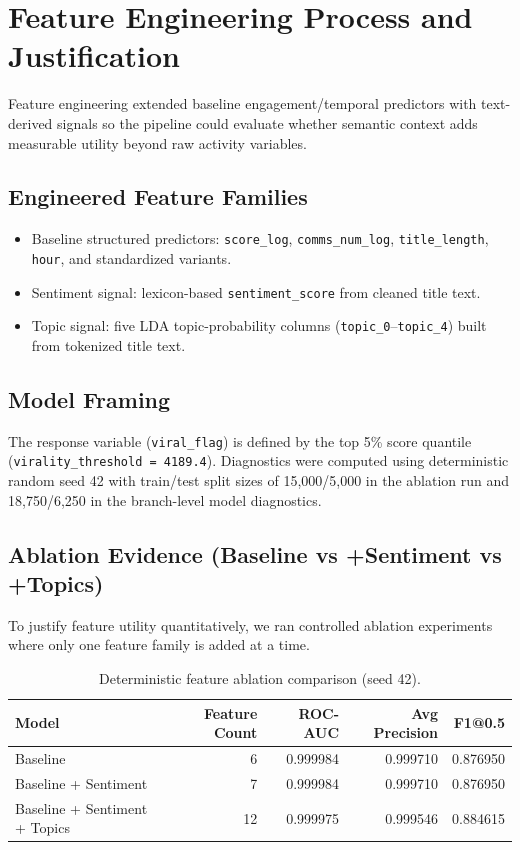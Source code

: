 \section{Feature Engineering Process and Justification}

Feature engineering extended baseline engagement/temporal predictors with text-derived signals so the pipeline could evaluate whether semantic context adds measurable utility beyond raw activity variables.

\subsection{Engineered Feature Families}
\begin{itemize}
  \item Baseline structured predictors: \texttt{score\_log}, \texttt{comms\_num\_log}, \texttt{title\_length}, \texttt{hour}, and standardized variants.
  \item Sentiment signal: lexicon-based \texttt{sentiment\_score} from cleaned title text.
  \item Topic signal: five LDA topic-probability columns (\texttt{topic\_0}--\texttt{topic\_4}) built from tokenized title text.
\end{itemize}

\subsection{Model Framing}
The response variable (\texttt{viral\_flag}) is defined by the top 5\% score quantile (\texttt{virality\_threshold = 4189.4}). Diagnostics were computed using deterministic random seed 42 with train/test split sizes of 15,000/5,000 in the ablation run and 18,750/6,250 in the branch-level model diagnostics.

\subsection{Ablation Evidence (Baseline vs +Sentiment vs +Topics)}
To justify feature utility quantitatively, we ran controlled ablation experiments where only one feature family is added at a time.

\begin{table}[h]
\centering
\begin{tabular}{lrrrr}
\toprule
Model & Feature Count & ROC-AUC & Avg Precision & F1@0.5 \\
\midrule
Baseline & 6 & 0.999984 & 0.999710 & 0.876950 \\
Baseline + Sentiment & 7 & 0.999984 & 0.999710 & 0.876950 \\
Baseline + Sentiment + Topics & 12 & 0.999975 & 0.999546 & 0.884615 \\
\bottomrule
\end{tabular}
\caption{Deterministic feature ablation comparison (seed 42).}
\end{table}

